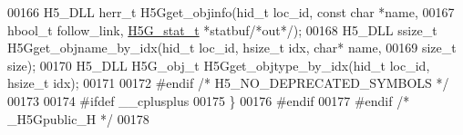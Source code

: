 \begin{DoxyCode}
00166 H5\_DLL herr\_t H5Gget\_objinfo(hid\_t loc\_id, \textcolor{keyword}{const} \textcolor{keywordtype}{char} *name,
00167     hbool\_t follow\_link, \hyperlink{struct_h5_g__stat__t}{H5G\_stat\_t} *statbuf\textcolor{comment}{/*out*/});
00168 H5\_DLL ssize\_t H5Gget\_objname\_by\_idx(hid\_t loc\_id, hsize\_t idx, \textcolor{keywordtype}{char}* name,
00169     \textcolor{keywordtype}{size\_t} size);
00170 H5\_DLL H5G\_obj\_t H5Gget\_objtype\_by\_idx(hid\_t loc\_id, hsize\_t idx);
00171 
00172 \textcolor{preprocessor}{#endif }\textcolor{comment}{/* H5\_NO\_DEPRECATED\_SYMBOLS */}\textcolor{preprocessor}{}
00173 
00174 \textcolor{preprocessor}{#ifdef \_\_cplusplus}
00175 \}
00176 \textcolor{preprocessor}{#endif}
00177 \textcolor{preprocessor}{#endif }\textcolor{comment}{/* \_H5Gpublic\_H */}\textcolor{preprocessor}{}
00178 
\end{DoxyCode}
